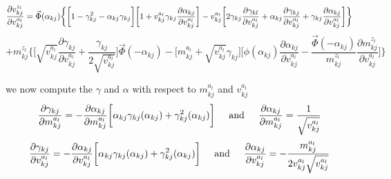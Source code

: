 \documentclass[]{article}
\begin{document}
\begin{equation}
	\frac{\partial v_{kj}^{z_l}}{\partial v_{kj}^{a_l}} = \vec{\Phi}(\alpha_{kj})\biggl\{\bigg[1-\gamma_{kj}^2-\alpha_{kj}\gamma_{kj}\bigg]\bigg[1+v_{kj}^{a_l}\gamma_{kj}\frac{\partial \alpha_{kj}}{\partial v_{kj}^{a_l}}\bigg] -v_{kj}^{a_l}\bigg[2\gamma_{kj}\frac{\partial \gamma_{kl}}{\partial v_{kj}^{a_l}} + \alpha_{kj}\frac{\partial \gamma_{kj}}{\partial v_{kj}^{a_l}} + \gamma_{kj}\frac{\partial \alpha_{kj}}{\partial v_{kj}^{a_l}}\bigg]\biggr\}
	\notag
\end{equation}
\begin{equation}
	+m_{kj}^{z_l}\biggl\{\bigg[\sqrt{v_{kj}^{a_l}}\frac{\partial \gamma_{kj}}{\partial v_{kj}^{a_l}} + \frac{\gamma_{kj}}{2\sqrt{v_{kj}^{a_l}}}\bigg]\vec{\Phi}(-\alpha_{kj}) - \bigg[m_{kj}^{a_l}+\sqrt{v_{kj}^{a_l}}\gamma_{kj}\bigg]\bigg[\phi(\alpha_{kj})\frac{\partial \alpha_{kj}}{\partial v_{kj}^{a_l}} - \frac{\vec{\Phi}(-\alpha_{kj})}{m_{kj}^{z_l}}\frac{\partial m_{kj}^{z_l}}{\partial v_{kj}^{a_l}}\bigg]\biggr\}
	\label{equ:83}
\end{equation}

we now compute the $\gamma$ and $\alpha$ with respect to $m_{kj}^{a_l}$ and $v_{kj}^{a_l}$
\begin{equation}
	\frac{\partial \gamma_{kj}}{\partial m_{kj}^{a_l}} = -\frac{\partial \alpha_{kj}}{\partial m_{kj}^{a_l}}\bigg[\alpha_{kj}\gamma_{kj}(\alpha_{kj}) + \gamma^2_{kj}(\alpha_{kj})\bigg] \hspace{0.2in} \text{and} \hspace{0.2in} \frac{\partial\alpha_{kj}}{\partial m_{kj}^{a_l}} = \frac{1}{\sqrt {v^{a_l}_{kj}}}
	\label{equ:84}
\end{equation}
\begin{equation}
	\frac{\partial \gamma_{kj}}{\partial v_{kj}^{a_l}} = -\frac{\partial \alpha_{kj}}{\partial v_{kj}^{a_l}}\bigg[\alpha_{kj}\gamma_{kj}(\alpha_{kj}) + \gamma^2_{kj}(\alpha_{kj})\bigg] \hspace{0.2in} \text{and} \hspace{0.2in} \frac{\partial\alpha_{kj}}{\partial v_{kj}^{a_l}} = -\frac{m_{kj}^{a_l}}{2v^{a_l}_{kj}\sqrt{v^{a_l}_{kj}}}
	\label{equ:85}
\end{equation}


\end{document}
